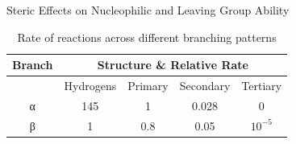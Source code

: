 \documentclass[10pt]{article}
\begin{document}
\begin{core}{Steric Effects on Nucleophilic and Leaving Group Ability}
      \begin{table}[H]
      \centering
      \begin{tabular}{ccccc}
      \hline
      \textbf{Branch} & \multicolumn{4}{c}{\textbf{Structure \& Relative Rate}} \\
      \hline
       & Hydrogens & Primary & Secondary & Tertiary \\
      α & 145 & 1 & 0.028 & 0 \\
      β & 1 & 0.8 & 0.05 & $10^{-5}$ \\
      \hline
      \end{tabular}
      \caption{Rate of \snt reactions across different branching patterns}
      \label{tab:filler9}
      \end{table} 

    \end{core}
\end{document}

